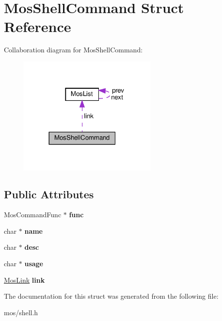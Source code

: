 \hypertarget{structMosShellCommand}{}\section{Mos\+Shell\+Command Struct Reference}
\label{structMosShellCommand}


Collaboration diagram for Mos\+Shell\+Command\+:\nopagebreak
\begin{figure}[H]
\begin{center}
\leavevmode
\includegraphics[width=197pt]{structMosShellCommand__coll__graph}
\end{center}
\end{figure}
\subsection*{Public Attributes}
\begin{DoxyCompactItemize}
\item 
\mbox{\label{structMosShellCommand_a0bc9d73e1638c8d81b2f85cbeef4cdfb}} 
Mos\+Command\+Func $\ast$ {\bfseries func}
\item 
\mbox{\label{structMosShellCommand_aed49fc90b1944413b60051b7a41b3b72}} 
char $\ast$ {\bfseries name}
\item 
\mbox{\label{structMosShellCommand_a33df2ba720d7f1bb1b9be5bb76289eb4}} 
char $\ast$ {\bfseries desc}
\item 
\mbox{\label{structMosShellCommand_a49c3168bcb084dac1d27fbc3989d75c3}} 
char $\ast$ {\bfseries usage}
\item 
\mbox{\label{structMosShellCommand_a3f76a3694d6ac5a4db19aebce1fd9406}} 
\hyperlink{structMosList}{Mos\+Link} {\bfseries link}
\end{DoxyCompactItemize}


The documentation for this struct was generated from the following file\+:\begin{DoxyCompactItemize}
\item 
mos/shell.\+h\end{DoxyCompactItemize}
